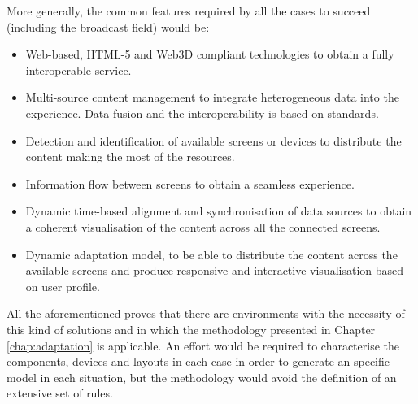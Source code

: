 More generally, the common features required by all the cases to succeed (including the broadcast field) would be: 
\begin{itemize}	
	 \item Web-based, HTML-5 and Web3D compliant technologies to obtain a fully interoperable service. 
	 
	 \item Multi-source content management to integrate heterogeneous data into the experience. Data fusion and the interoperability is based on standards.
	 	 
	 \item Detection and identification of available screens or devices to distribute the content making the most of the resources. 
	 
	 \item Information flow between screens to obtain a seamless experience.
	
	 \item Dynamic time-based alignment and synchronisation of data sources to obtain a coherent visualisation of the content across all the connected screens.
	
	 \item Dynamic adaptation model, to be able to distribute the content across the available screens and produce responsive and interactive visualisation based on user profile. 
\end{itemize}
	 
All the aforementioned proves that there are environments with the necessity of this kind of solutions and in which the methodology presented in Chapter \ref{chap:adaptation} is applicable. An effort would be required to characterise the components, devices and layouts in each case in order to generate an specific model in each situation, but the methodology would avoid the definition of an extensive set of rules.  
